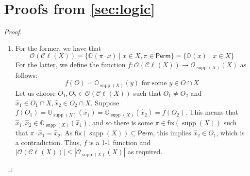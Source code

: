 \documentclass[10pt,a4paper]{article}
\theoremstyle{definition}
\theoremstyle{remark}
\DeclareMathOperator{\supp}{supp}
\newcommand\orb[1][]{\mathcal{O}_{#1}}
\newcommand\orbs[1][]{\mathbb{O}_{#1}}
\newcommand\cls[1]{\mathcal{C}\!\ell_{#1}}
\newcommand\fix{\mathsf{fix}}
\newcommand\Perm[0]{{\mathsf{Perm}}}
\begin{document}
\newpage
\appendix
\section{Proofs from \cref{sec:logic}}
\nomlemma*

\begin{proof}
	\begin{enumerate}
	\item For the former, we have that 
	$$\orb(\cls{}(X)) = \{\orbs(\pi\cdot x) \mid x \in X, \pi \in \Perm\} = \{\orbs(x) \mid x \in X\}$$
	For the latter, we define the function $f: \orb(\cls{}(X)) \to \orb[\supp(X)](X)$ as follows:
	\[
	f(O) = \orbs[\supp(X)](y) \text{ for some } y \in O \cap X
	\]
	Let us choose $O_1, O_2 \in \orb(\cls{}(X))$ such that $O_1 \neq O_2$ and $\hat x_1 \in O_1 \cap X, \hat x_2 \in O_2 \cap X$.
	Suppose $f(O_1) = \orbs[\supp(X)](\hat x_1) = \orbs[\supp(X)](\hat x_2) = f(O_2)$. 
	This means that $\hat x_1, \hat x_2 \in \orbs[\supp(X)](\hat x_1)$,
	and so there is some $\pi \in \fix(\supp(X))$ such that $\pi \cdot \hat x_1 = \hat x_2$. 
	As $\fix(\supp(X)) \subseteq \Perm$, this implies $\hat x_2 \in O_1$, which is a contradiction. 
	Thus, $f$ is a 1-1 function and $|\orb(\cls{}(X))| \le |\orb[\supp(X)](X)|$ as required.	
	

\end{enumerate}
\end{proof}
\end{document}

